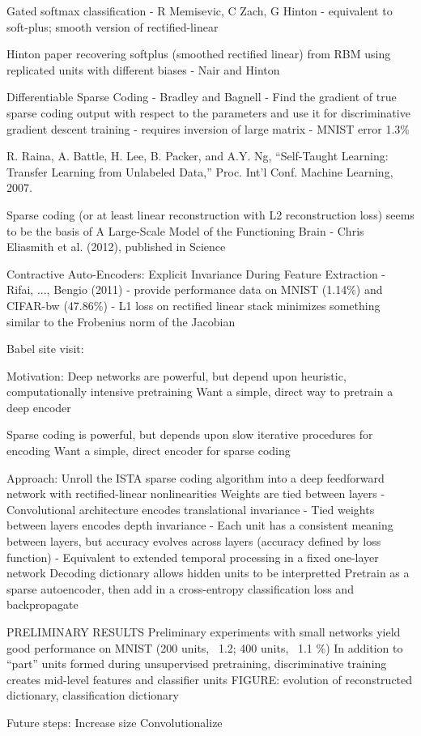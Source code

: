 Gated softmax classification - R Memisevic, C Zach, G Hinton - equivalent to soft-plus; smooth version of rectified-linear

Hinton paper recovering softplus (smoothed rectified linear) from RBM using replicated units with different biases - Nair and Hinton

Differentiable Sparse Coding - Bradley and Bagnell - Find the gradient of true sparse coding output with respect to the parameters and use it for discriminative gradient descent training - requires inversion of large matrix - MNIST error 1.3\%


R. Raina, A. Battle, H. Lee, B. Packer, and A.Y. Ng, “Self-Taught Learning: Transfer Learning from Unlabeled Data,” Proc. Int’l Conf. Machine Learning, 2007.

Sparse coding (or at least linear reconstruction with L2 reconstruction loss) seems to be the basis of A Large-Scale Model of the Functioning Brain - Chris Eliasmith et al. (2012), published in Science


Contractive Auto-Encoders: Explicit Invariance During Feature Extraction - Rifai, ..., Bengio (2011) - provide performance data on MNIST (1.14\%) and CIFAR-bw (47.86\%) - L1 loss on rectified linear stack minimizes something similar to the Frobenius norm of the Jacobian



Babel site visit:

Motivation:
Deep networks are powerful, but depend upon heuristic, computationally intensive pretraining
Want a simple, direct way to pretrain a deep encoder

Sparse coding is powerful, but depends upon slow iterative procedures for encoding
Want a simple, direct encoder for sparse coding


Approach:
Unroll the ISTA sparse coding algorithm into a deep feedforward network with rectified-linear nonlinearities
Weights are tied between layers
  - Convolutional architecture encodes translational invariance
  - Tied weights between layers encodes depth invariance
  - Each unit has a consistent meaning between layers, but accuracy evolves across layers (accuracy defined by loss function)
  - Equivalent to extended temporal processing in a fixed one-layer network
Decoding dictionary allows hidden units to be interpretted
Pretrain as a sparse autoencoder, then add in a cross-entropy classification loss and backpropagate

PRELIMINARY RESULTS
Preliminary experiments with small networks yield good performance on MNIST (200 units, ~1.2; 400 units, ~1.1 \%)
In addition to ``part'' units formed during unsupervised pretraining, discriminative training  creates mid-level features and classifier units
FIGURE: evolution of reconstructed dictionary, classification dictionary

Future steps:
Increase size
Convolutionalize